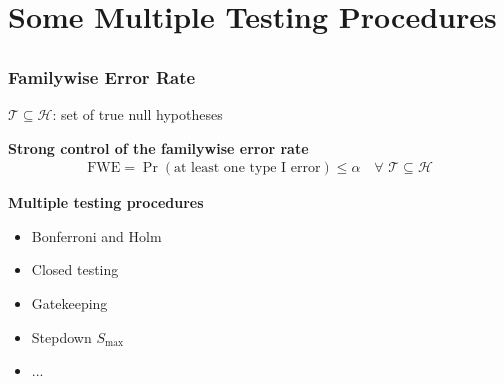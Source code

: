 \section{Some Multiple Testing Procedures}
\subsection{}
\begin{frame}
\frametitle{Familywise Error Rate}

$\mathcal{T}\subseteq\mathcal{H}$: set of true null hypotheses 

\bigskip

\textcolor{cambridgedarkorange}{\textbf{Strong control of the familywise error rate}}
\begin{eqnarray*}
\mathrm{FWE} = \Pr(\mathrm{at\,\,least\,\,one\,\,type\,\,I\,\,error})  \leq \alpha \quad \forall\,\, \mathcal{T}\subseteq \mathcal{H}
\end{eqnarray*}

\bigskip

\textcolor{cambridgedarkorange}{\textbf{Multiple testing procedures}}

\begin{itemize}
\item Bonferroni and Holm 
\item Closed testing
\item Gatekeeping
\item Stepdown $S_{\max}$
\item ...
\end{itemize}


\end{frame}
